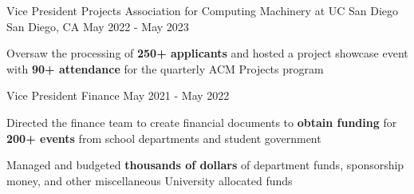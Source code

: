 \begin{cventries}

\cvtwoentry
{Vice President Projects}
{Association for Computing Machinery at UC San Diego}
{San Diego, CA}
{May 2022 - May 2023}
{
\begin{cvitems}
  \item Oversaw the processing of \textbf{250+ applicants} and hosted a project showcase event with \textbf{90+ attendance} for the quarterly ACM Projects program 
\end{cvitems}
}
{Vice President Finance}
{May 2021 - May 2022}
{
\begin{cvitems}
  \item Directed the finance team to create financial documents to \textbf{obtain funding} for \textbf{200+ events} from school departments and student government
  \item Managed and budgeted \textbf{thousands of dollars} of department funds, sponsorship money, and other miscellaneous University allocated funds
\end{cvitems}
}

\end{cventries}